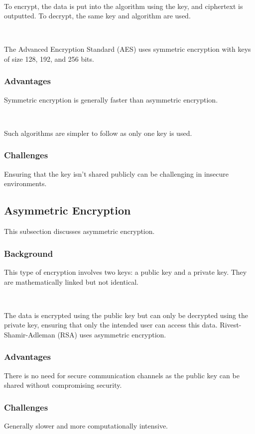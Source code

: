 \documentclass[11pt]{article}
\begin{document}
\

To encrypt, the data is put into the algorithm using the key, and ciphertext is outputted. To decrypt, the same key and algorithm are used.

\

The Advanced Encryption Standard (AES) uses symmetric encryption with keys of size 128, 192, and 256 bits. 


\subsubsection{Advantages}
Symmetric encryption is generally faster than asymmetric encryption.

\

Such algorithms are simpler to follow as only one key is used. 


\subsubsection{Challenges}
Ensuring that the key isn’t shared publicly can be challenging in insecure environments. 

\subsection{Asymmetric Encryption}
This subsection discusses asymmetric encryption.

\subsubsection{Background}
This type of encryption involves two keys: a public key and a private key. They are mathematically linked but not identical. 

\

The data is encrypted using the public key but can only be decrypted using the private key, ensuring that only the intended user can access this data.
Rivest-Shamir-Adleman (RSA) uses asymmetric encryption.


\subsubsection{Advantages}
There is no need for secure communication channels as the public key can be shared without compromising security.

\subsubsection{Challenges}
Generally slower and more computationally intensive.
\end{document}
